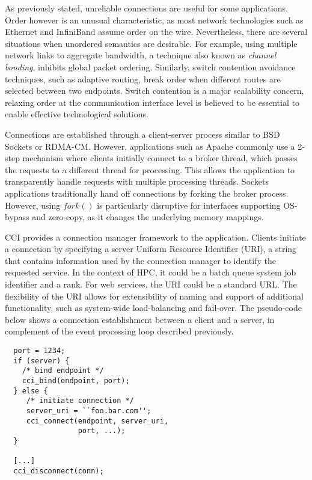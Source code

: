 As previously stated, unreliable connections are useful for some applications. 
Order however is an unusual characteristic, as most network technologies such 
as Ethernet and InfiniBand assume order on the wire. 
Nevertheless, there are several situations when unordered semantics are 
desirable. For example, using multiple network links to aggregate bandwidth, 
a technique also known as \emph{channel bonding}, inhibits global packet ordering. 
Similarly, switch contention avoidance techniques, 
such as adaptive routing, break order when different routes are selected 
between two endpoints. Switch contention is a major scalability concern, 
relaxing order at the communication interface level is believed to be 
essential to enable effective technological solutions.

Connections are established through a client-server process similar to 
BSD Sockets or RDMA-CM. However, applications such as 
Apache commonly use a 2-step mechanism where clients 
initially connect to a broker thread, which passes the requests to a 
different thread for processing. This allows the application to 
transparently handle requests with multiple processing threads. Sockets applications traditionally hand off connections by forking the broker process. However, using $fork()$ is particularly disruptive for interfaces supporting OS-bypass and zero-copy, as it changes the underlying memory mappings.

CCI provides a connection manager framework to 
the application. Clients initiate a connection by specifying a server 
Uniform Resource Identifier (URI), a string that contains information used 
by the connection manager to identify the requested service. In the context of 
HPC, it could be a batch queue system job identifier and a rank. For web 
services, the URI could be a standard URL. The flexibility of the URI allows 
for extensibility of naming and support of additional functionality, such as 
system-wide load-balancing and fail-over. The pseudo-code below shows a connection establishment between a client and a server, in complement of the event processing loop described previously.

\lstset{language=C, frame=single, basicstyle=\ttfamily\small}
\begin{lstlisting}
  port = 1234;
  if (server) {
    /* bind endpoint */
    cci_bind(endpoint, port);
  } else {
     /* initiate connection */
     server_uri = ``foo.bar.com'';
     cci_connect(endpoint, server_uri, 
                 port, ...);
  }

  [...]
  cci_disconnect(conn);
\end{lstlisting}

